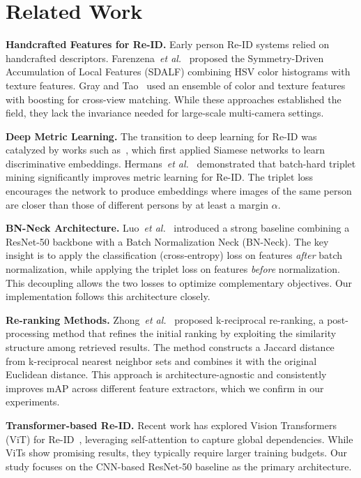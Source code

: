 \documentclass[final]{cvpr}
\begin{document}
\section{Related Work}

\textbf{Handcrafted Features for Re-ID.}
Early person Re-ID systems relied on handcrafted descriptors.
Farenzena~\emph{et al.}~\cite{farenzena2010person} proposed the Symmetry-Driven Accumulation of Local Features (SDALF) combining HSV color histograms with texture features.
Gray and Tao~\cite{gray2008viewpoint} used an ensemble of color and texture features with boosting for cross-view matching.
While these approaches established the field, they lack the invariance needed for large-scale multi-camera settings.

\textbf{Deep Metric Learning.}
The transition to deep learning for Re-ID was catalyzed by works such as~\cite{yi2014deep}, which first applied Siamese networks to learn discriminative embeddings.
Hermans~\emph{et al.}~\cite{hermans2017defense} demonstrated that batch-hard triplet mining significantly improves metric learning for Re-ID.
The triplet loss encourages the network to produce embeddings where images of the same person are closer than those of different persons by at least a margin $\alpha$.

\textbf{BN-Neck Architecture.}
Luo~\emph{et al.}~\cite{luo2019bag} introduced a strong baseline combining a ResNet-50 backbone with a Batch Normalization Neck (BN-Neck).
The key insight is to apply the classification (cross-entropy) loss on features \emph{after} batch normalization, while applying the triplet loss on features \emph{before} normalization.
This decoupling allows the two losses to optimize complementary objectives.
Our implementation follows this architecture closely.

\textbf{Re-ranking Methods.}
Zhong~\emph{et al.}~\cite{zhong2017reranking} proposed k-reciprocal re-ranking, a post-processing method that refines the initial ranking by exploiting the similarity structure among retrieved results.
The method constructs a Jaccard distance from k-reciprocal nearest neighbor sets and combines it with the original Euclidean distance.
This approach is architecture-agnostic and consistently improves mAP across different feature extractors, which we confirm in our experiments.

\textbf{Transformer-based Re-ID.}
Recent work has explored Vision Transformers (ViT) for Re-ID~\cite{he2021transreid}, leveraging self-attention to capture global dependencies.
While ViTs show promising results, they typically require larger training budgets.
Our study focuses on the CNN-based ResNet-50 baseline as the primary architecture.
\end{document}
